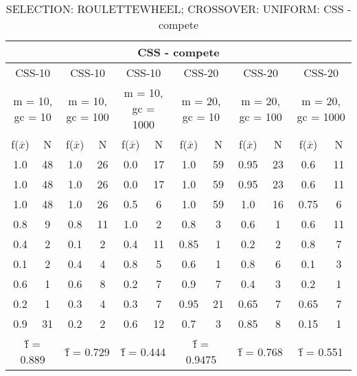 \begin{table}[H]
	\centering
	\caption{SELECTION: ROULETTEWHEEL; CROSSOVER: UNIFORM: CSS - compete}
	\begin{adjustbox}{width=1\textwidth}
		\begin{tabular}{ |c|c||c|c||c|c||c|c||c|c||c|c| }
			\hline
			\multicolumn{12}{|c|}{CSS - compete} \\
			\hline
			\multicolumn{2}{|c||}{CSS-10} & \multicolumn{2}{c||}{CSS-10} & \multicolumn{2}{c||}{CSS-10} & \multicolumn{2}{c||}{CSS-20} & \multicolumn{2}{c||}{CSS-20} & \multicolumn{2}{c|}{CSS-20}\\
			\hline
			\multicolumn{2}{|c||}{m = 10, gc = 10} & \multicolumn{2}{c||}{m = 10, gc = 100} & \multicolumn{2}{c||}{m = 10, gc = 1000} & \multicolumn{2}{c||}{m = 20, gc = 10} & \multicolumn{2}{c||}{m = 20, gc = 100} & \multicolumn{2}{c|}{m = 20, gc = 1000}\\
			\hline
			f($\bar{x}$) & N & f($\bar{x}$) & N & f($\bar{x}$) & N & f($\bar{x}$) & N & f($\bar{x}$) & N & f($\bar{x}$) & N\\
			\hline
			\hline
			1.0 & 48 & 1.0 & 26 & 0.0 & 17 & 1.0 & 59 & 0.95 & 23 & 0.6 & 11\\
			\hline
			1.0 & 48 & 1.0 & 26 & 0.0 & 17 & 1.0 & 59 & 0.95 & 23 & 0.6 & 11\\
			1.0 & 48 & 1.0 & 26 & 0.5 & 6 & 1.0 & 59 & 1.0 & 16 & 0.75 & 6\\
			0.8 & 9 & 0.8 & 11 & 1.0 & 2 & 0.8 & 3 & 0.6 & 1 & 0.6 & 11\\
			0.4 & 2 & 0.1 & 2 & 0.4 & 11 & 0.85 & 1 & 0.2 & 2 & 0.8 & 7\\
			0.1 & 2 & 0.4 & 4 & 0.8 & 5 & 0.6 & 1 & 0.8 & 6 & 0.1 & 3\\
			0.6 & 1 & 0.6 & 8 & 0.2 & 7 & 0.9 & 7 & 0.4 & 3 & 0.2 & 1\\
			0.2 & 1 & 0.3 & 4 & 0.3 & 7 & 0.95 & 21 & 0.65 & 7 & 0.65 & 7\\
			0.9 & 31 & 0.2 & 2 & 0.6 & 12 & 0.7 & 3 & 0.85 & 8 & 0.15 & 1\\
			\hline
			\multicolumn{2}{|c||}{\^{f} = 0.889} & \multicolumn{2}{c||}{\^{f} = 0.729} & \multicolumn{2}{c||}{\^{f} = 0.444} & \multicolumn{2}{c||}{\^{f} = 0.9475} & \multicolumn{2}{c||}{\^{f} = 0.768} & \multicolumn{2}{c|}{\^{f} = 0.551}\\
			\hline
		\end{tabular}
	\end{adjustbox}
\end{table}
